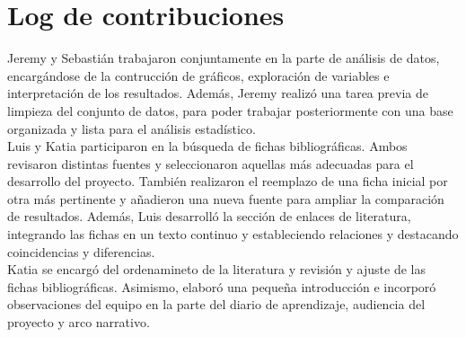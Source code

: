 \documentclass[12pt]{article}
\begin{document}
\section{Log de contribuciones}
Jeremy y Sebastián trabajaron conjuntamente en la parte de análisis de datos, encargándose de la contrucción de gráficos, exploración de variables e interpretación de los resultados. Además, Jeremy realizó una tarea previa de limpieza del conjunto de datos, para poder trabajar posteriormente con una base organizada y lista para el análisis estadístico.
\\
Luis y Katia participaron en la búsqueda de fichas bibliográficas. Ambos revisaron distintas fuentes y seleccionaron aquellas más adecuadas para el desarrollo del proyecto. También realizaron el reemplazo de una ficha inicial por otra más pertinente y añadieron una nueva fuente para ampliar la comparación de resultados. Además, Luis desarrolló la sección de enlaces de literatura, integrando las fichas en un texto continuo y estableciendo relaciones y destacando coincidencias y diferencias.
\\
Katia se encargó del ordenamineto de la literatura y revisión y ajuste de las fichas bibliográficas. Asimismo, elaboró una pequeña introducción e incorporó observaciones del equipo en la parte del diario de aprendizaje, audiencia del proyecto y arco narrativo.
\end{document}
